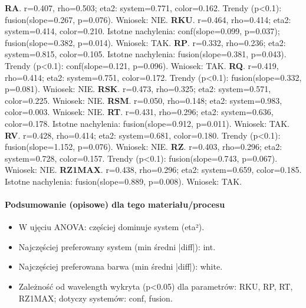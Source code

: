 \documentclass[
  10pt,
]{article}
\begin{document}
\textbf{RA}. r=0.407, rho=0.503; eta2: system=0.771, color=0.162. Trendy
(p\textless0.1): fusion(slope=0.267, p=0.076). Wniosek: NIE.
\textbf{RKU}. r=0.464, rho=0.414; eta2: system=0.414, color=0.210.
Istotne nachylenia: conf(slope=0.099, p=0.037); fusion(slope=0.382,
p=0.014). Wniosek: TAK. \textbf{RP}. r=0.332, rho=0.236; eta2:
system=0.815, color=0.105. Istotne nachylenia: fusion(slope=0.381,
p=0.043). Trendy (p\textless0.1): conf(slope=0.121, p=0.096). Wniosek:
TAK. \textbf{RQ}. r=0.419, rho=0.414; eta2: system=0.751, color=0.172.
Trendy (p\textless0.1): fusion(slope=0.332, p=0.081). Wniosek: NIE.
\textbf{RSK}. r=0.473, rho=0.325; eta2: system=0.571, color=0.225.
Wniosek: NIE. \textbf{RSM}. r=0.050, rho=0.148; eta2: system=0.983,
color=0.003. Wniosek: NIE. \textbf{RT}. r=0.431, rho=0.296; eta2:
system=0.636, color=0.178. Istotne nachylenia: fusion(slope=0.912,
p=0.011). Wniosek: TAK. \textbf{RV}. r=0.428, rho=0.414; eta2:
system=0.681, color=0.180. Trendy (p\textless0.1): fusion(slope=1.152,
p=0.076). Wniosek: NIE. \textbf{RZ}. r=0.403, rho=0.296; eta2:
system=0.728, color=0.157. Trendy (p\textless0.1): fusion(slope=0.743,
p=0.067). Wniosek: NIE. \textbf{RZ1MAX}. r=0.438, rho=0.296; eta2:
system=0.659, color=0.185. Istotne nachylenia: fusion(slope=0.889,
p=0.008). Wniosek: TAK.

\paragraph{Podsumowanie (opisowe) dla tego materiału/procesu}
\begin{itemize}
\item W ujęciu ANOVA: częściej dominuje system (eta²).
\item Najczęściej preferowany system (min średni |diff|): int.
\item Najczęściej preferowana barwa (min średni |diff|): white.
\item Zależność od wavelength wykryta (p<0.05) dla parametrów: RKU, RP, RT, RZ1MAX; dotyczy systemów: conf, fusion.
\end{itemize}
\end{document}

